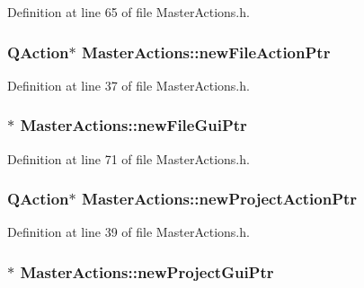 Definition at line 65 of file Master\-Actions.\-h.

\hypertarget{class_master_actions_a4da658e527460b8d5b0a263820259e97}{
\subsubsection[{new\-File\-Action\-Ptr}]{\setlength{\rightskip}{0pt plus 5cm}Q\-Action$\ast$ Master\-Actions\-::new\-File\-Action\-Ptr\hspace{0.3cm}{\ttfamily [private]}}}\label{class_master_actions_a4da658e527460b8d5b0a263820259e97}


Definition at line 37 of file Master\-Actions.\-h.

\hypertarget{class_master_actions_a8839c174acf071c0d9bfe450160218eb}{
\subsubsection[{new\-File\-Gui\-Ptr}]{$\ast$ Master\-Actions\-::new\-File\-Gui\-Ptr\hspace{0.3cm}{\ttfamily [private]}}}\label{class_master_actions_a8839c174acf071c0d9bfe450160218eb}


Definition at line 71 of file Master\-Actions.\-h.

\hypertarget{class_master_actions_a114ab55c27fc183af68ebaaa86748a82}{
\subsubsection[{new\-Project\-Action\-Ptr}]{\setlength{\rightskip}{0pt plus 5cm}Q\-Action$\ast$ Master\-Actions\-::new\-Project\-Action\-Ptr\hspace{0.3cm}{\ttfamily [private]}}}\label{class_master_actions_a114ab55c27fc183af68ebaaa86748a82}


Definition at line 39 of file Master\-Actions.\-h.

\hypertarget{class_master_actions_a78733336a3d5fd3bbb55eaf0215f0d40}{
\subsubsection[{new\-Project\-Gui\-Ptr}]{$\ast$ Master\-Actions\-::new\-Project\-Gui\-Ptr\hspace{0.3cm}{\ttfamily [private]}}}\label{class_master_actions_a78733336a3d5fd3bbb55eaf0215f0d40}


